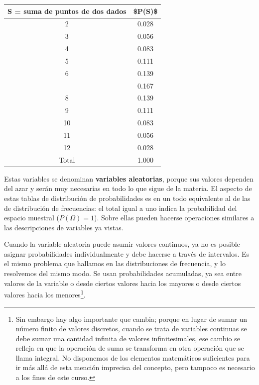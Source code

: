 \documentclass[]{article}
\let\rmarkdownfootnote\footnote%
\def\footnote{\protect\rmarkdownfootnote}
\begin{document}
\begin{table}[H]
\centering
\begin{tabular}{cc}
\toprule
S = suma de puntos de dos dados & \$P(S)\$\\
\midrule
\rowcolor{gray!6}  2 & 0.028\\
3 & 0.056\\
\rowcolor{gray!6}  4 & 0.083\\
5 & 0.111\\
\rowcolor{gray!6}  6 & 0.139\\
\addlinespace
7 & 0.167\\
\rowcolor{gray!6}  8 & 0.139\\
9 & 0.111\\
\rowcolor{gray!6}  10 & 0.083\\
11 & 0.056\\
\addlinespace
\rowcolor{gray!6}  12 & 0.028\\
Total & 1.000\\
\bottomrule
\end{tabular}
\end{table}

Estas variables se denominan \textbf{variables aleatorias}, porque sus
valores dependen del azar y serán muy necesarias en todo lo que sigue de
la materia. El aspecto de estas tablas de distribución de probabilidades
es en un todo equivalente al de las de distribución de frecuencias: el
total igual a uno indica la probabilidad del espacio muestral
(\(P(\Omega) = 1\)). Sobre ellas pueden hacerse operaciones similares a
las descripciones de variables ya vistas.

Cuando la variable aleatoria puede asumir valores continuos, ya no es
posible asignar probabilidades individualmente y debe hacerse a través
de intervalos. Es el mismo problema que hallamos en las distribuciones
de frecuencia, y lo resolvemos del mismo modo. Se usan probabilidades
acumuladas, ya sea entre valores de la variable o desde ciertos valores
hacia los mayores o desde ciertos valores hacia los menores\footnote{Sin
  embargo hay algo importante que cambia; porque en lugar de sumar un
  número finito de valores discretos, cuando se trata de variables
  continuas se debe sumar una cantidad infinita de valores
  infinitesimales, ese cambio se refleja en que la operación de suma se
  transforma en otra operación que se llama integral. No disponemos de
  los elementos matemáticos suficientes para ir más allá de esta mención
  imprecisa del concepto, pero tampoco es necesario a los fines de este
  curso.}.
\end{document}
